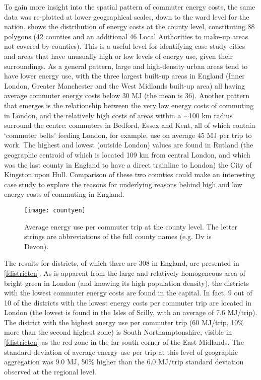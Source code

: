 To gain more insight into the spatial pattern of commuter energy costs,
the same data was re-plotted at lower geographical scales, down to the ward
level for the nation.  shows the distribution of energy costs
at the county level, constituting 88 polygons (42 counties and an additional 46
Local Authorities to make-up areas not covered by counties). This is a useful
level for identifying case study cities and areas that have unusually high
or low levels of energy use, given their surroundings. As a general pattern,
large and high-density urban areas tend to have lower energy use, with
the three largest built-up areas in England (Inner London, Greater Manchester
and the West Midlands built-up area) all having average commuter energy costs
below 30 MJ (the mean is 36). Another pattern that emerges is the relationship
between the very low energy costs of commuting in London, and the relatively high
costs of areas within a $\sim$100 km radius surround the centre: commuters in Bedford, Essex and
Kent, all of which contain `commuter belts' feeding London, for example, use
on average 45 MJ per trip to work. The highest and lowest (outside London)
values are found in Rutland (the geographic centroid of which is located 109
km from central London, and which was the last county in England to have
a direct trainline to London) the City of Kingston upon Hull.
Comparison of these two counties could make an interesting case study
to explore the reasons for underlying reasons behind high and low
energy costs of commuting in England.

\begin{figure}[htbp]
\begin{center}
    \texttt{[image: countyen]}  \end{center}
  \caption[Average energy use per commuter trip at the county level]
  {Average energy use per commuter trip at the county level. The
  letter strings are abbreviations of the full county names (e.g. Dv is Devon).}
 \label{fcountyen}
\end{figure}

The results for districts, of which there are 308 in England,
are presented in \cref{fdistricten}.
As is apparent from the large and relatively homogeneous
area of bright green in London (and
knowing its high population density), the districts with the lowest
commuter energy costs are found in the capital. In fact,
9 out of 10 of the districts with the lowest energy costs per
commuter trip are located in London (the lowest is found in the
Isles of Scilly, with an average of 7.6 MJ/trip). The district with the
highest energy use per commuter trip (60 MJ/trip, 10\% more than the second
highest zone) is South Northamptonshire, visible
in \cref{fdistricten} as the red zone in the far south corner of the
East Midlands. The standard deviation of average energy use per trip at
this level of geographic aggregation was 9.0 MJ, 50\% higher than the
6.0 MJ/trip standard deviation observed at the regional level.

